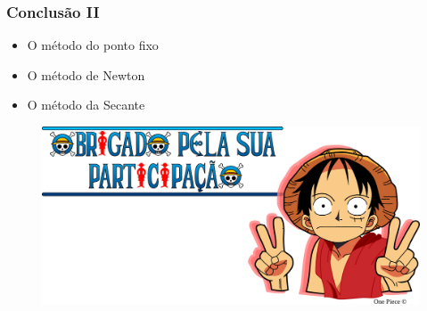 \documentclass{beamer}
\theoremstyle{mystyle}
\begin{document}
\begin{frame}
	\frametitle{Conclusão II}	
	\begin{itemize}
		\item O método do ponto fixo
		\item O método de Newton
		\item O método da Secante
	\end{itemize}
\end{frame}

\begin{frame}[plain]
\bigskip
\bigskip
\bigskip
\bigskip
\bigskip
\begin{figure}
	\centering
	\includegraphics[width=0.9\linewidth]{../Luffy_v}
	\label{fig:luffyv}
\end{figure}
\end{frame}
\end{document}
